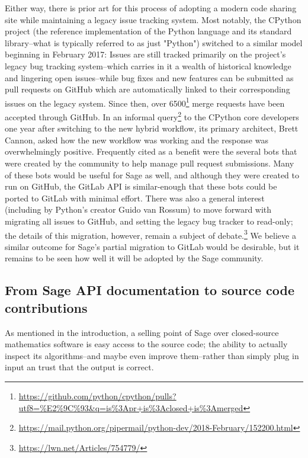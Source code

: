 {Either way, there is prior art for this process of adopting a modern code
sharing site while maintaining a legacy issue tracking system.  Most notably,
the CPython project (the reference implementation of the Python language and
its standard library--what is typically referred to as just "Python") switched
to a similar model beginning in February 2017: Issues are still tracked
primarily on the project's legacy bug tracking system--which carries in it a
wealth of historical knowledge and lingering open issues--while bug fixes and
new features can be submitted as pull requests on GitHub which are
automatically linked to their corresponding issues on the legacy system.  Since
then, over
6500\footnote{\url{https://github.com/python/cpython/pulls?utf8=\%E2\%9C\%93\&q=is\%3Apr+is\%3Aclosed+is\%3Amerged}}
merge requests have been accepted through GitHub.  In an informal
query\footnote{\url{https://mail.python.org/pipermail/python-dev/2018-February/152200.html}}
to the CPython core developers one year after switching to the new hybrid
workflow, its primary architect, Brett Cannon, asked how the new workflow was
working and the response was overwhelmingly positive.  Frequently cited as a
benefit were the several bots that were created by the community to help manage
pull request submissions.  Many of these bots would be useful for Sage as well,
and although they were created to run on GitHub, the GitLab API is
similar-enough that these bots could be ported to GitLab with minimal effort.
There was also a general interest (including by Python's creator Guido van
Rossum) to move forward with migrating all issues to GitHub, and setting the
legacy bug tracker to read-only; the details of this migration, however, remain
a subject of debate.\footnote{\url{https://lwn.net/Articles/754779/}}  We
believe a similar outcome for Sage's partial migration to GitLab would be
desirable, but it remains to be seen how well it will be adopted by the Sage
community.


\hypertarget{source-in-documentation}{%
\subsection{From Sage API documentation to source code contributions}\label{source-in-documentation}}

As mentioned in the introduction, a selling point of Sage over closed-source
mathematics software is easy access to the source code; the ability to actually
inspect its algorithms--and maybe even improve them--rather than simply plug in
input an trust that the output is correct.

}
